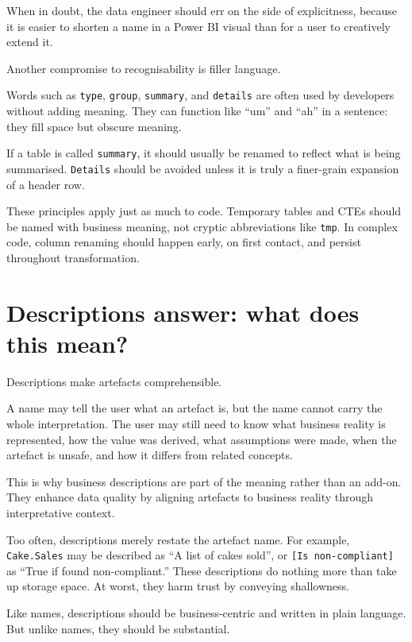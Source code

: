 \documentclass[10pt,openany,10pt]{book}
\begin{document}
When in doubt, the data engineer should err on the side of explicitness,
because it is easier to shorten a name in a Power BI visual than for a
user to creatively extend it.

Another compromise to recognisability is filler language.

Words such as \texttt{type}, \texttt{group}, \texttt{summary}, and
\texttt{details} are often used by developers without adding meaning.
They can function like ``um'' and ``ah'' in a sentence: they fill space
but obscure meaning.

If a table is called \texttt{summary}, it should usually be renamed to
reflect what is being summarised. \texttt{Details} should be avoided
unless it is truly a finer-grain expansion of a header row.

These principles apply just as much to code. Temporary tables and CTEs
should be named with business meaning, not cryptic abbreviations like
\texttt{tmp}. In complex code, column renaming should happen early, on
first contact, and persist throughout transformation.

\section{Descriptions answer: what does this
mean?}\label{descriptions-answer-what-does-this-mean}

Descriptions make artefacts comprehensible.

A name may tell the user what an artefact is, but the name cannot carry
the whole interpretation. The user may still need to know what business
reality is represented, how the value was derived, what assumptions were
made, when the artefact is unsafe, and how it differs from related
concepts.

This is why business descriptions are part of the meaning rather than an
add-on. They enhance data quality by aligning artefacts to business
reality through interpretative context.

Too often, descriptions merely restate the artefact name. For example,
\texttt{Cake.Sales} may be described as ``A list of cakes sold'', or
\texttt{{[}Is\ non-compliant{]}} as ``True if found non-compliant.''
These descriptions do nothing more than take up storage space. At worst,
they harm trust by conveying shallowness.

Like names, descriptions should be business-centric and written in plain
language. But unlike names, they should be substantial.
\end{document}
